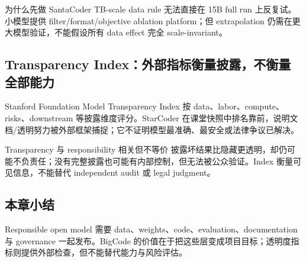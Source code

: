 
\begin{knowledgebox}{为什么先做 SantaCoder}
TB-scale data rule 无法直接在 15B full run 上反复试。小模型提供 filter/format/objective ablation platform；但 extrapolation 仍需在更大模型验证，不能假设所有 data effect 完全 scale-invariant。
\end{knowledgebox}

\subsection{Transparency Index：外部指标衡量披露，不衡量全部能力}

Stanford Foundation Model Transparency Index 按 data、labor、compute、risks、downstream 等披露维度评分。StarCoder 在课堂快照中排名靠前，说明文档/透明努力被外部框架捕捉；它不证明模型最准确、最安全或法律争议已解决。


\begin{warningbox}{Transparency 与 responsibility 相关但不等价}
披露坏结果比隐藏更透明，却仍可能不负责任；没有完整披露也可能有内部控制，但无法被公众验证。Index 衡量可见信息，不能替代 independent audit 或 legal judgment。
\end{warningbox}

\subsection{本章小结}

Responsible open model 需要 data、weights、code、evaluation、documentation 与 governance 一起发布。BigCode 的价值在于把这些层变成项目目标；透明度指标则提供外部检查，但不能替代能力与风险评估。

